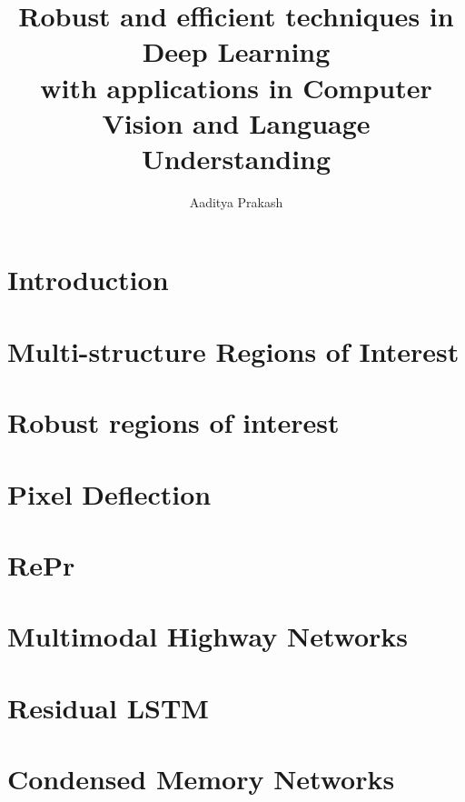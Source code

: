 \documentclass{brandeis-dissertationx}
\title{Robust and efficient techniques in Deep Learning  \\
\large with applications in Computer Vision and Language Understanding}
\author{Aaditya Prakash}
\begin{document}
\acknowledgments{}
\preface{}
\thesisfront[copyrightpage]




\listoffigures
\listoftables
\listofalgorithms



\chapter{Introduction}


\chapter{Multi-structure Regions of Interest}


\chapter{Robust regions of interest}


\chapter{Pixel Deflection}


\chapter{RePr}


\chapter{Multimodal Highway Networks}


\chapter{Residual LSTM}


\chapter{Condensed Memory Networks}


\printbibliography
\end{document}
